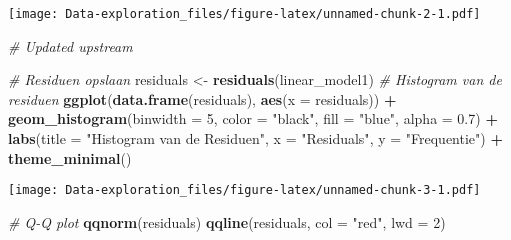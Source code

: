 \documentclass[
]{article}
\newenvironment{Shaded}{\begin{snugshade}}{\end{snugshade}}
\newcommand{\AttributeTok}[1]{\textcolor[rgb]{0.13,0.29,0.53}{#1}}
\newcommand{\CommentTok}[1]{\textcolor[rgb]{0.56,0.35,0.01}{\textit{#1}}}
\newcommand{\DecValTok}[1]{\textcolor[rgb]{0.00,0.00,0.81}{#1}}
\newcommand{\FloatTok}[1]{\textcolor[rgb]{0.00,0.00,0.81}{#1}}
\newcommand{\FunctionTok}[1]{\textcolor[rgb]{0.13,0.29,0.53}{\textbf{#1}}}
\newcommand{\NormalTok}[1]{#1}
\newcommand{\OtherTok}[1]{\textcolor[rgb]{0.56,0.35,0.01}{#1}}
\newcommand{\SpecialCharTok}[1]{\textcolor[rgb]{0.81,0.36,0.00}{\textbf{#1}}}
\newcommand{\StringTok}[1]{\textcolor[rgb]{0.31,0.60,0.02}{#1}}
\begin{document}
\begin{Shaded}
\end{Shaded}

\texttt{[image: Data-exploration\_files/figure-latex/unnamed-chunk-2-1.pdf]}

\begin{Shaded}
\begin{Highlighting}[]
\CommentTok{\# Updated upstream}


\CommentTok{\# Residuen opslaan}
\NormalTok{residuals }\OtherTok{\textless{}{-}} \FunctionTok{residuals}\NormalTok{(linear\_model1) }
\CommentTok{\# Histogram van de residuen}
\FunctionTok{ggplot}\NormalTok{(}\FunctionTok{data.frame}\NormalTok{(residuals), }\FunctionTok{aes}\NormalTok{(}\AttributeTok{x =}\NormalTok{ residuals)) }\SpecialCharTok{+}
  \FunctionTok{geom\_histogram}\NormalTok{(}\AttributeTok{binwidth =} \DecValTok{5}\NormalTok{, }\AttributeTok{color =} \StringTok{"black"}\NormalTok{, }\AttributeTok{fill =} \StringTok{"blue"}\NormalTok{, }\AttributeTok{alpha =} \FloatTok{0.7}\NormalTok{) }\SpecialCharTok{+}
  \FunctionTok{labs}\NormalTok{(}\AttributeTok{title =} \StringTok{"Histogram van de Residuen"}\NormalTok{, }\AttributeTok{x =} \StringTok{"Residuals"}\NormalTok{, }\AttributeTok{y =} \StringTok{"Frequentie"}\NormalTok{) }\SpecialCharTok{+}
  \FunctionTok{theme\_minimal}\NormalTok{()}
\end{Highlighting}
\end{Shaded}

\texttt{[image: Data-exploration\_files/figure-latex/unnamed-chunk-3-1.pdf]}

\begin{Shaded}
\begin{Highlighting}[]
\CommentTok{\# Q{-}Q plot}
\FunctionTok{qqnorm}\NormalTok{(residuals)}
\FunctionTok{qqline}\NormalTok{(residuals, }\AttributeTok{col =} \StringTok{"red"}\NormalTok{, }\AttributeTok{lwd =} \DecValTok{2}\NormalTok{)}
\end{Highlighting}
\end{Shaded}
\end{document}
